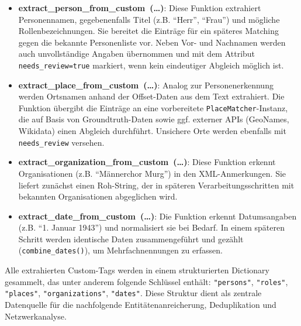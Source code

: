 \documentclass[12pt, a4paper, ngerman, bidi=default]{article}
\newcommand{\code}[1]{\colorbox{VeryLightGray}{\texttt{#1}}} %
\begin{document}
\begin{itemize}
  \item \textbf{extract\_person\_from\_custom~(\dots)}: Diese Funktion extrahiert Personennamen, gegebenenfalls Titel (z.B. \enquote{Herr}, \enquote{Frau}) und mögliche Rollenbezeichnungen. Sie bereitet die Einträge für ein späteres Matching gegen die bekannte Personenliste vor. Neben Vor- und Nachnamen werden auch unvollständige Angaben übernommen und mit dem Attribut \code{needs\_review=true} markiert, wenn kein eindeutiger Abgleich möglich ist.
  
  \item \textbf{extract\_place\_from\_custom~(\dots)}: Analog zur Personenerkennung werden Ortsnamen anhand der Offset-Daten aus dem Text extrahiert. Die Funktion übergibt die Einträge an eine vorbereitete \code{PlaceMatcher}-Instanz, die auf Basis von Groundtruth-Daten sowie ggf. externer APIs (GeoNames, Wikidata) einen Abgleich durchführt. Unsichere Orte werden ebenfalls mit \code{needs\_review} versehen.
  
  \item \textbf{extract\_organization\_from\_custom~(\dots)}: Diese Funktion erkennt Organisationen (z.B. \enquote{Männerchor Murg}) in den XML-Anmerkungen. Sie liefert zunächst einen Roh-String, der in späteren Verarbeitungsschritten mit bekannten Organisationen abgeglichen wird. 
  
  \item \textbf{extract\_date\_from\_custom~(\dots)}: Die Funktion erkennt Datumsangaben (z.B. \enquote{1. Januar 1943}) und normalisiert sie bei Bedarf. In einem späteren Schritt werden identische Daten zusammengeführt und gezählt (\code{combine\_dates()}), um Mehrfachnennungen zu erfassen.
\end{itemize}

Alle extrahierten Custom-Tags werden in einem strukturierten Dictionary gesammelt, das unter anderem folgende Schlüssel enthält: \code{"persons"}, \code{"roles"}, \code{"places"}, \code{"organizations"}, \code{"dates"}. Diese Struktur dient als zentrale Datenquelle für die nachfolgende Entitätenanreicherung, Deduplikation und Netzwerkanalyse.
\end{document}
